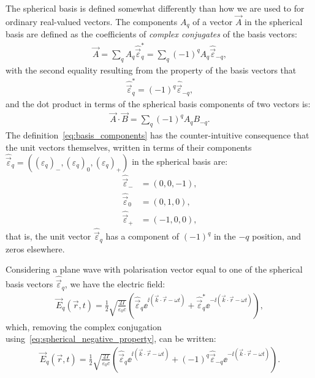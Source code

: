 The spherical basis is defined somewhat differently than how we are used to for ordinary real-valued vectors. The components $A_q$ of a vector $\vec A$ in the spherical basis are defined as the coefficients of \emph{complex conjugates} of the basis vectors:
\begin{align}\label{eq:basis_components}
\vec A = \sum_q A_q \hat{\vec\varepsilon}_q^* = \sum_q (-1)^q A_q \hat{\vec\varepsilon}_{-q},
\end{align}
with the second equality resulting from the property of the basis vectors that
\begin{align}\label{eq:spherical_negative_property}
\hat{\vec\varepsilon}_q^* = (-1)^q\hat{\vec\varepsilon}_{-q},
\end{align}
and the dot product in terms of the spherical basis components of two vectors is:
\begin{align}\label{eq:spherical_dot_product}
\vec A \cdot \vec B = \sum_q (-1)^q A_q B_{-q}.
\end{align}
The definition~\eqref{eq:basis_components} has the counter-intuitive consequence that the unit vectors themselves, written in terms of their components $\hat{\vec\varepsilon}_q = \left((\varepsilon_q)_{-}, (\varepsilon_q)_{0}, (\varepsilon_q)_{+}\right)$ in the spherical basis are:
\begin{align}
\hat{\vec\varepsilon}_{-} &= (0, 0, -1),\\
\hat{\vec\varepsilon}_0 &= (0, 1, 0),\\
\hat{\vec\varepsilon}_{+} &= (-1, 0, 0),
\end{align}
that is, the unit vector $\hat{\vec\varepsilon}_{q}$ has a component of $(-1)^q$ in the $-q$ position, and zeros elsewhere.

Considering a plane wave with polarisation vector equal to one of the spherical basis vectors $\hat{\vec\varepsilon}_q$, we have the electric field:
\begin{align}\label{eq:complex_plane_wave_q}
\vec E_q(\vec r, t) = \frac12\sqrt{\frac{2I}{\varepsilon_0 c}}
\left(\hat{\vec\varepsilon}_q \ee^{\ii(\vec k \cdot \vec r - \omega t)}
+ \hat{\vec\varepsilon}_q^* \ee^{-\ii(\vec k \cdot \vec r - \omega t)} \right),
\end{align}
which, removing the complex conjugation using~\eqref{eq:spherical_negative_property}, can be written:
\begin{align}\label{eq:complex_plane_wave_q_noconj}
\vec E_q(\vec r, t) = \frac12\sqrt{\frac{2I}{\varepsilon_0 c}}
\left(\hat{\vec\varepsilon}_q \ee^{\ii(\vec k \cdot \vec r - \omega t)}
+ (-1)^q\hat{\vec\varepsilon}_{-q} \ee^{-\ii(\vec k \cdot \vec r - \omega t)} \right).
\end{align}

